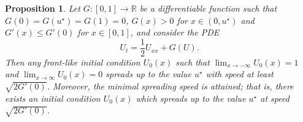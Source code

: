 \documentclass{article}
\newtheorem{propn}[theorem]{Proposition}
\newcommand{\B}[1]{\mathbb{#1}}
\begin{document}
\begin{propn} Let $G:[0,1]\to \B{R}$ be a differentiable function such that $G(0)=G(u^\star)=G(1)=0$, $G(x)>0$ for $x\in (0,u^\star)$ and $G'(x)\leq G'(0)$ for $x\in [0,1]$, and consider the PDE 
\begin{equation}\label{PDEtoCompare} U_t = \frac12 U_{xx} + G(U).\end{equation}
Then any front-like initial condition $U_0(x)$ such that $\lim_{x\to-\infty}U_0(x)=1$ and $\lim_{x\to\infty}U_0(x)=0$ spreads up to the value $u^\star$ with speed at least $\sqrt{2G'(0)}$. Moreover, the minimal spreading speed is attained; that is, there exists an initial condition $U_0(x)$ which spreads up to the value $u^\star$ at speed $\sqrt{2G'(0)}$.%
\end{propn}
\end{document}
